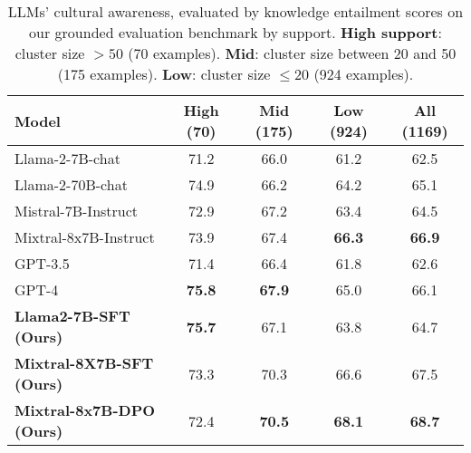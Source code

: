 \begin{table}[ht]
\centering
\begin{tabular}{lcccc}
\toprule
\textbf{Model} & \multicolumn{1}{c}{\textbf{High} (70)} & \multicolumn{1}{c}{\textbf{Mid} (175)} & \multicolumn{1}{c}{\textbf{Low} (924)} & \multicolumn{1}{c}{\textbf{All} (1169)} \\
\midrule
\midrule
Llama-2-7B-chat  & 71.2 & 66.0 & 61.2 & 62.5\\
\midrule
Llama-2-70B-chat  & 74.9 & 66.2 & 64.2 & 65.1 \\
\midrule
Mistral-7B-Instruct  & 72.9 & 67.2 & 63.4 & 64.5\\
\midrule
Mixtral-8x7B-Instruct  & 73.9 & 67.4 & \textbf{66.3} & \textbf{66.9}\\
\midrule
GPT-3.5  & 71.4 & 66.4 & 61.8 & 62.6\\
\midrule
GPT-4  & \textbf{75.8} & \textbf{67.9} & 65.0 & 66.1\\
\midrule
\midrule
\textbf{Llama2-7B-SFT (Ours)}  & \textbf{75.7} & 67.1 & 63.8 & 64.7\\
\midrule
 \textbf{Mixtral-8X7B-SFT (Ours)}  & 73.3 & 70.3 & 66.6 & 67.5 \\
\midrule

\textbf{Mixtral-8x7B-DPO (Ours)}   & 72.4 & \textbf{70.5} & \textbf{68.1} & \textbf{68.7}\\

\bottomrule
\end{tabular}
\caption{\label{tab: grounded eval by support} LLMs' cultural awareness, evaluated by knowledge entailment scores on our grounded evaluation benchmark by support. \textbf{High support}: cluster size $> 50$ (70 examples). \textbf{Mid}: cluster size between 20 and 50 (175 examples). \textbf{Low}: cluster size $\leq 20$ (924 examples).  
}
\end{table}